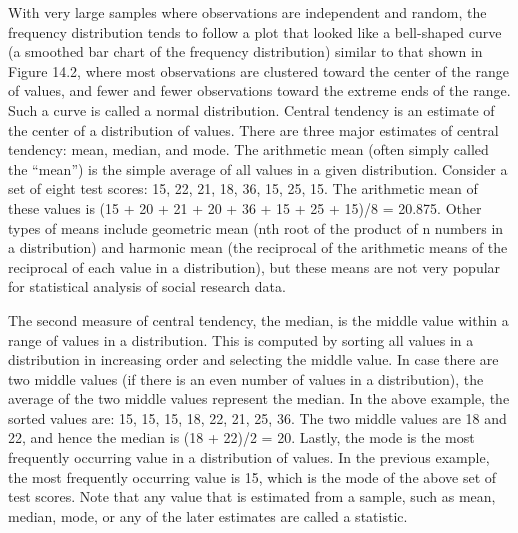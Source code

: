 With very large samples where observations are independent and random, the frequency distribution tends to follow a plot that looked like a bell-shaped curve (a smoothed bar chart of the frequency distribution) similar to that shown in Figure 14.2, where most observations are clustered toward the center of the range of values, and fewer and fewer observations toward the extreme ends of the range. Such a curve is called a normal distribution. Central tendency is an estimate of the center of a distribution of values. There are three major estimates of central tendency: mean, median, and mode. The arithmetic mean (often simply called the “mean”) is the simple average of all values in a given distribution. Consider a set of eight test scores: 15, 22, 21, 18, 36, 15, 25, 15. The arithmetic mean of these values is (15 + 20 + 21 + 20 + 36 + 15 + 25 + 15)/8 = 20.875. Other types of means include geometric mean (nth root of the product of n numbers in a distribution) and harmonic mean (the reciprocal of the arithmetic means of the reciprocal of each value in a distribution), but these means are not very popular for statistical analysis of social research data.

The second measure of central tendency, the median, is the middle value within a range of values in a distribution. This is computed by sorting all values in a distribution in increasing order and selecting the middle value. In case there are two middle values (if there is an even number of values in a distribution), the average of the two middle values represent the median. In the above example, the sorted values are: 15, 15, 15, 18, 22, 21, 25, 36. The two middle values are 18 and 22, and hence the median is (18 + 22)/2 = 20. Lastly, the mode is the most frequently occurring value in a distribution of values. In the previous example, the most frequently occurring value is 15, which is the mode of the above set of test scores. Note that any value that is estimated from a sample, such as mean, median, mode, or any of the later estimates are called a statistic.

